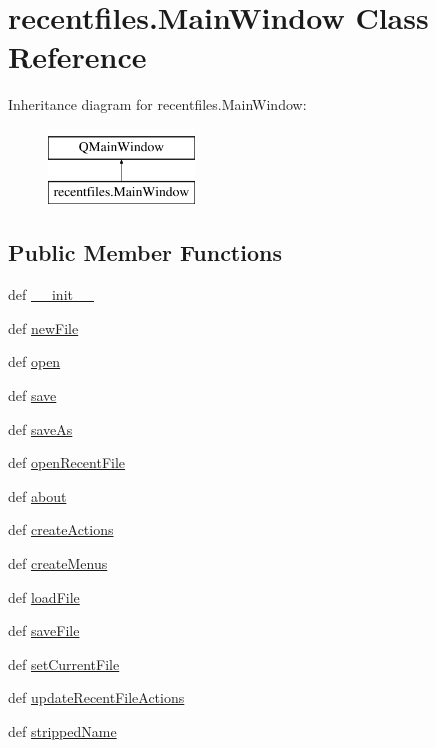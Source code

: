 \hypertarget{classrecentfiles_1_1MainWindow}{}\section{recentfiles.\+Main\+Window Class Reference}
\label{classrecentfiles_1_1MainWindow}
Inheritance diagram for recentfiles.\+Main\+Window\+:\begin{figure}[H]
\begin{center}
\leavevmode
\includegraphics[height=2.000000cm]{classrecentfiles_1_1MainWindow}
\end{center}
\end{figure}
\subsection*{Public Member Functions}
\begin{DoxyCompactItemize}
\item 
def \hyperlink{classrecentfiles_1_1MainWindow_ad6c275a7bc42524816e604d256d53c0b}{\+\_\+\+\_\+init\+\_\+\+\_\+}
\item 
def \hyperlink{classrecentfiles_1_1MainWindow_aa9c401467b87f170b2f4d473af5c1a08}{new\+File}
\item 
def \hyperlink{classrecentfiles_1_1MainWindow_ab8603561b78b1ad50e09341bd99206f9}{open}
\item 
def \hyperlink{classrecentfiles_1_1MainWindow_a73a81d2d73c5d41eb153b99c847978b3}{save}
\item 
def \hyperlink{classrecentfiles_1_1MainWindow_a9172c273f1a0eac76bfd4ec8c64eecf6}{save\+As}
\item 
def \hyperlink{classrecentfiles_1_1MainWindow_a6ed23e7dcbe21a913eba6317979d74b9}{open\+Recent\+File}
\item 
def \hyperlink{classrecentfiles_1_1MainWindow_ac9aeb2ab9767e55a649f2010d3a798f6}{about}
\item 
def \hyperlink{classrecentfiles_1_1MainWindow_aec63ea0df91bb34fa17015113971b838}{create\+Actions}
\item 
def \hyperlink{classrecentfiles_1_1MainWindow_a5bb4fb099797766707f1665e87d8c298}{create\+Menus}
\item 
def \hyperlink{classrecentfiles_1_1MainWindow_a2ea3852cb562ee7594d4858a4fdc4342}{load\+File}
\item 
def \hyperlink{classrecentfiles_1_1MainWindow_a8367e197eaffcb42190117f6221bd8c8}{save\+File}
\item 
def \hyperlink{classrecentfiles_1_1MainWindow_af9298950d9c2a585eea0c5cda11aaf1d}{set\+Current\+File}
\item 
def \hyperlink{classrecentfiles_1_1MainWindow_aa9b85ffd480ab372cc9385d5063d9fc5}{update\+Recent\+File\+Actions}
\item 
def \hyperlink{classrecentfiles_1_1MainWindow_af263ba90552d5ee01870ece045ffb80d}{stripped\+Name}
\end{DoxyCompactItemize}
